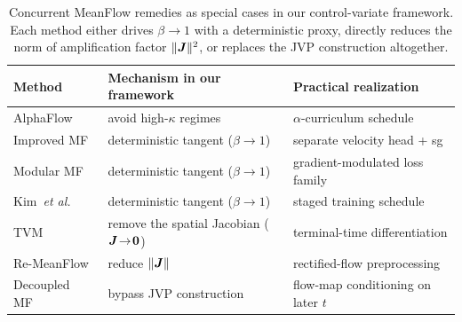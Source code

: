 \begin{table}[!t]
    \centering
    \caption{Concurrent MeanFlow remedies as special cases in our control-variate framework. Each method either drives $\beta\!\to\!1$ with a deterministic proxy, directly reduces the norm of amplification factor $\|{\bm{J}}\|^{2}$, or replaces the JVP construction altogether.}
    \label{tab: concurrent-positioning}
    \begin{tabular}{@{}lll@{}}
        \toprule
        \textbf{Method} & \textbf{Mechanism in our framework} & \textbf{Practical realization} \\
        \midrule
        AlphaFlow~\cite{zhang2025alphaflowunderstandingimprovingmeanflow} & avoid high-$\kappa$ regimes & $\alpha$-curriculum schedule \\
        Improved MF~\cite{geng2025improvedmeanflowschallenges} & deterministic tangent ($\beta\!\to\!1$) & separate velocity head + sg \\
        Modular MF~\cite{you2025modularmeanflow} & deterministic tangent ($\beta\!\to\!1$) & gradient-modulated loss family \\
        Kim~\textit{et al.}~\cite{kim2025understandingacceleratingmeanflow} & deterministic tangent ($\beta\!\to\!1$) & staged training schedule \\
        TVM~\cite{zhou2026terminalvelocitymatching} & remove the spatial Jacobian (${\bm{J}}\!\to\!\bm{0}$) & terminal-time differentiation \\
        Re-MeanFlow~\cite{zhang2026overcomingcurvaturebottleneckmeanflow} & reduce $\|{\bm{J}}\|$ & rectified-flow preprocessing \\
        Decoupled MF~\cite{lee2025decoupledmeanflow} & bypass JVP construction & flow-map conditioning on later $t$ \\
        \bottomrule
    \end{tabular}
    \vspace{-1em}
\end{table}
